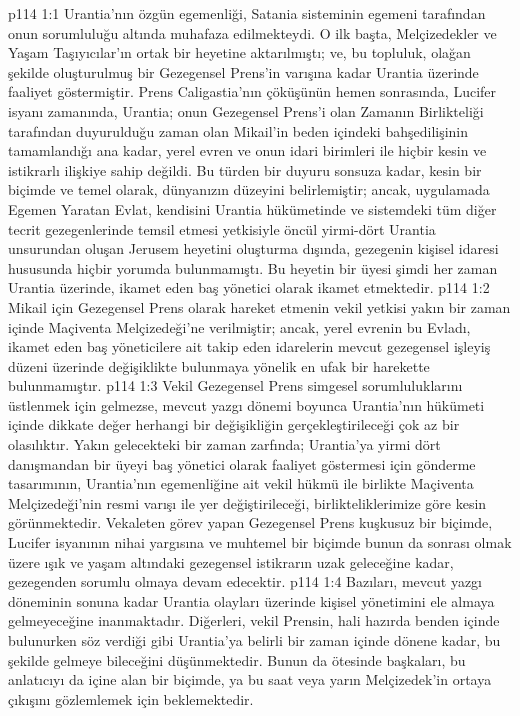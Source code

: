 \vs p114 1:1 Urantia’nın özgün egemenliği, Satania sisteminin egemeni tarafından onun sorumluluğu altında muhafaza edilmekteydi. O ilk başta, Melçizedekler ve Yaşam Taşıyıcılar’ın ortak bir heyetine aktarılmıştı; ve, bu topluluk, olağan şekilde oluşturulmuş bir Gezegensel Prens’in varışına kadar Urantia üzerinde faaliyet göstermiştir. Prens Caligastia’nın çöküşünün hemen sonrasında, Lucifer isyanı zamanında, Urantia; onun Gezegensel Prens’i olan Zamanın Birlikteliği tarafından duyurulduğu zaman olan Mikail’in beden içindeki bahşedilişinin tamamlandığı ana kadar, yerel evren ve onun idari birimleri ile hiçbir kesin ve istikrarlı ilişkiye sahip değildi. Bu türden bir duyuru sonsuza kadar, kesin bir biçimde ve temel olarak, dünyanızın düzeyini belirlemiştir; ancak, uygulamada Egemen Yaratan Evlat, kendisini Urantia hükümetinde ve sistemdeki tüm diğer tecrit gezegenlerinde temsil etmesi yetkisiyle öncül yirmi\hyp{}dört Urantia unsurundan oluşan Jerusem heyetini oluşturma dışında, gezegenin kişisel idaresi hususunda hiçbir yorumda bulunmamıştı. Bu heyetin bir üyesi şimdi her zaman Urantia üzerinde, ikamet eden baş yönetici olarak ikamet etmektedir.
\vs p114 1:2 Mikail için Gezegensel Prens olarak hareket etmenin vekil yetkisi yakın bir zaman içinde Maçiventa Melçizedeği’ne verilmiştir; ancak, yerel evrenin bu Evladı, ikamet eden baş yöneticilere ait takip eden idarelerin mevcut gezegensel işleyiş düzeni üzerinde değişiklikte bulunmaya yönelik en ufak bir harekette bulunmamıştır.
\vs p114 1:3 Vekil Gezegensel Prens simgesel sorumluluklarını üstlenmek için gelmezse, mevcut yazgı dönemi boyunca Urantia’nın hükümeti içinde dikkate değer herhangi bir değişikliğin gerçekleştirileceği çok az bir olasılıktır. Yakın gelecekteki bir zaman zarfında; Urantia’ya yirmi dört danışmandan bir üyeyi baş yönetici olarak faaliyet göstermesi için gönderme tasarımının, Urantia’nın egemenliğine ait vekil hükmü ile birlikte Maçiventa Melçizedeği’nin resmi varışı ile yer değiştirileceği, birlikteliklerimize göre kesin görünmektedir. Vekaleten görev yapan Gezegensel Prens kuşkusuz bir biçimde, Lucifer isyanının nihai yargısına ve muhtemel bir biçimde bunun da sonrası olmak üzere ışık ve yaşam altındaki gezegensel istikrarın uzak geleceğine kadar, gezegenden sorumlu olmaya devam edecektir.
\vs p114 1:4 Bazıları, mevcut yazgı döneminin sonuna kadar Urantia olayları üzerinde kişisel yönetimini ele almaya gelmeyeceğine inanmaktadır. Diğerleri, vekil Prensin, hali hazırda benden içinde bulunurken söz verdiği gibi Urantia’ya belirli bir zaman içinde dönene kadar, bu şekilde gelmeye bileceğini düşünmektedir. Bunun da ötesinde başkaları, bu anlatıcıyı da içine alan bir biçimde, ya bu saat veya yarın Melçizedek'in ortaya çıkışını gözlemlemek için beklemektedir.
